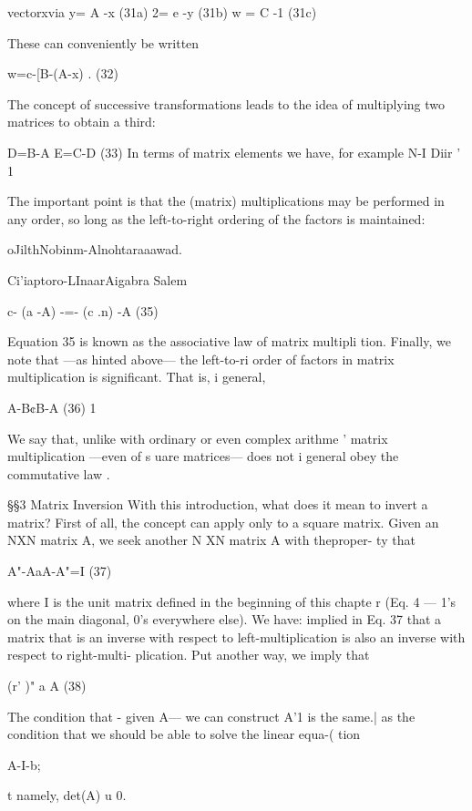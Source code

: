 {{{{{{{{vectorxvia
y= A -x (31a)
2= e -y (31b)
w = C -1 (31c)

These can conveniently be written

w=c-[B-(A-x) . (32)

 

The concept of successive transformations leads to the idea of
multiplying two matrices to obtain a third:

D=B-A E=C-D (33)
In terms of matrix elements we have, for example
N-I
Diir ' 1%

The important point is that the (matrix) multiplications may be
performed in any order, so long as the left-to-right ordering of
the factors is maintained:

oJilthNobinm-Alnohtaraaawad.

Ci'iaptoro-LInaarAigabra Salem

   
  
  
  
  

c- (a -A) -=- (c .n) -A (35)

Equation 35 is known as the associative law of matrix multipli
tion. Finally, we note that —as hinted above— the left-to-ri
order of factors in matrix multiplication is significant. That is, i
general,

A-B¢B-A (36) 1

We say that, unlike with ordinary or even complex arithme '
matrix multiplication —even of s uare matrices— does not i
general obey the commutative law .

\S\S3 Matrix Inversion
With this introduction, what does it mean to invert a matrix? First
of all, the concept can apply only to a square matrix. Given an
NXN matrix A, we seek another N XN matrix A with theproper-
ty that

 

A"-AaA-A"=I (37)

where I is the unit matrix defined in the beginning of this chapte r
(Eq. 4 — 1's on the main diagonal, 0's everywhere else). We have:
implied in Eq. 37 that a matrix that is an inverse with respect to
left-multiplication is also an inverse with respect to right-multi-
plication. Put another way, we imply that

(r' )" a A (38)

The condition that - given A— we can construct A'1 is the same.|
as the condition that we should be able to solve the linear equa-(
tion

A-I-b;

t namely, det(A) u 0.

}}}}}}}}
